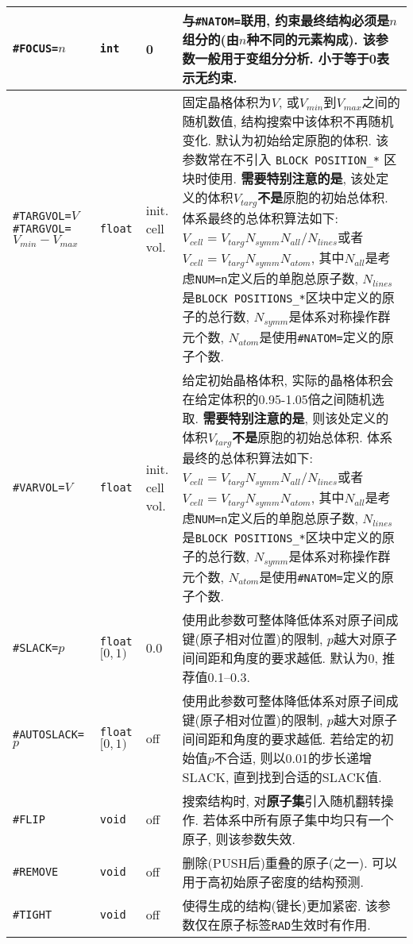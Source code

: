 \documentclass[a4paper, 10pt]{article}
\begin{document}
\begin{center}
\begin{longtable}{m{11em}|m{4em}<{\centering}|m{3em}<{\centering}|m{15em}}
\midrule
\verb|#FOCUS=|\(n\) & \verb|int| & 0 & 与\verb|#NATOM=|联用, 约束最终结构必须是\(n\)组分的(由\(n\)种不同的元素构成). 该参数一般用于变组分分析. 小于等于0表示无约束.\\
\midrule
\verb|#TARGVOL=|\(V\) \verb|#TARGVOL=|\(V_{min}-V_{max}\) & \verb|float| & init. cell vol. & 固定晶格体积为\(V\), 或\(V_{min}\)到\(V_{max}\)之间的随机数值, 结构搜索中该体积不再随机变化. 默认为初始给定原胞的体积. 该参数常在不引入 \verb|BLOCK POSITION_*| 区块时使用. \textbf{需要特别注意的是}, 该处定义的体积\(V_{targ}\)\textbf{不是}原胞的初始总体积. 体系最终的总体积算法如下: \(V_{cell} = V_{targ} N_{symm} N_{all} / N_{lines}\)或者\(V_{cell} = V_{targ} N_{symm} N_{atom} \), 其中\(N_{all}\)是考虑\verb|NUM=n|定义后的单胞总原子数, \(N_{lines}\)是\verb|BLOCK POSITIONS_*|区块中定义的原子的总行数, \(N_{symm}\)是体系对称操作群元个数, \(N_{atom}\)是使用\verb|#NATOM=|定义的原子个数.\\
\midrule
\verb|#VARVOL=|\(V\)& \verb|float| & init. cell vol. & 给定初始晶格体积, 实际的晶格体积会在给定体积的0.95-1.05倍之间随机选取. \textbf{需要特别注意的是}, 则该处定义的体积\(V_{targ}\)\textbf{不是}原胞的初始总体积. 体系最终的总体积算法如下: \(V_{cell} = V_{targ} N_{symm} N_{all} / N_{lines}\)或者\(V_{cell} = V_{targ} N_{symm} N_{atom} \), 其中\(N_{all}\)是考虑\verb|NUM=n|定义后的单胞总原子数, \(N_{lines}\)是\verb|BLOCK POSITIONS_*|区块中定义的原子的总行数, \(N_{symm}\)是体系对称操作群元个数, \(N_{atom}\)是使用\verb|#NATOM=|定义的原子个数.\\
\midrule
\verb|#SLACK=|\(p\)& \verb|float| \([0,1)\) & 0.0 & 使用此参数可整体降低体系对原子间成键(原子相对位置)的限制, \(p\)越大对原子间间距和角度的要求越低. 默认为0, 推荐值0.1--0.3.\\
\midrule
\verb|#AUTOSLACK=|\(p\)& \verb|float| \([0,1)\) & off & 使用此参数可整体降低体系对原子间成键(原子相对位置)的限制, \(p\)越大对原子间间距和角度的要求越低. 若给定的初始值\(p\)不合适, 则以0.01的步长递增SLACK, 直到找到合适的SLACK值.\\
\midrule
\verb|#FLIP|& \verb|void| & off & 搜索结构时, 对\textbf{原子集}引入随机翻转操作. 若体系中所有原子集中均只有一个原子, 则该参数失效.\\
\midrule
\verb|#REMOVE|& \verb|void| & off & 删除(PUSH后)重叠的原子(之一). 可以用于高初始原子密度的结构预测.\\
\midrule
\verb|#TIGHT|& \verb|void| & off & 使得生成的结构(键长)更加紧密. 该参数仅在原子标签\verb|RAD|生效时有作用.\\
\midrule

\end{longtable}
\end{center}
\end{document}
